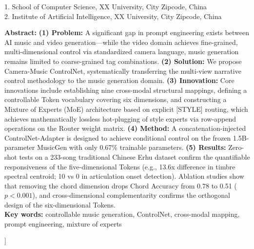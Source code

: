 \documentclass[twocolumn, a4paper, 10pt]{ctexart}
\begin{document}
\begin{center}
    { 1. School of Computer Science, XX University, City Zipcode, China\\
    2. Institute of Artificial Intelligence, XX University, City Zipcode, China\par}
    \vspace{6mm}
    
    \parbox{0.9\textwidth}{
        {\bfseries Abstract:} \textbf{(1) Problem:} A significant gap in prompt engineering exists between AI music and video generation—while the video domain achieves fine-grained, multi-dimensional control via standardized camera language, music generation remains limited to coarse-grained tag combinations. \textbf{(2) Solution:} We propose Camera-Music ControlNet, systematically transferring the multi-view narrative control methodology to the music generation domain. \textbf{(3) Innovation:} Core innovations include establishing nine cross-modal structural mappings, defining a controllable Token vocabulary covering six dimensions, and constructing a Mixture of Experts (MoE) architecture based on explicit [STYLE] routing, which achieves mathematically lossless hot-plugging of style experts via row-append operations on the Router weight matrix. \textbf{(4) Method:} A concatenation-injected ControlNet-Adapter is designed to achieve conditional control on the frozen 1.5B-parameter MusicGen with only 0.67\% trainable parameters. \textbf{(5) Results:} Zero-shot tests on a 233-song traditional Chinese Erhu dataset confirm the quantifiable responsiveness of the five-dimensional Tokens (e.g., 13.6x difference in timbre spectral centroid; 10 vs 0 in articulation onset detection). Ablation studies show that removing the chord dimension drops Chord Accuracy from 0.78 to 0.51 ($p < 0.001$), and cross-dimensional complementarity confirms the orthogonal design of the six-dimensional Tokens.\\
        {\bfseries Key words:} controllable music generation, ControlNet, cross-modal mapping, prompt engineering, mixture of experts
    }
    \vspace{8mm}
\end{center}
]

\begingroup
\renewcommand{\thefootnote}{}
\endgroup
\end{document}
